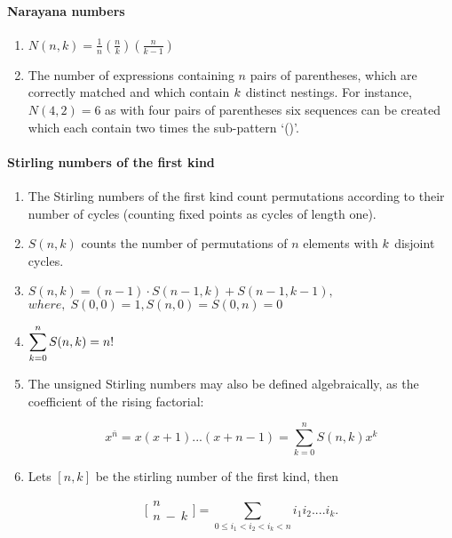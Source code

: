 \paragraph{Narayana numbers}\begin{enumerate}

            
            \item $N(n,k)=\frac{1}{n}\left(\frac{n}{k}\right)\left(\frac{n}{k-1}\right)$
            \item 
                The number of expressions containing $n$ pairs of parentheses, which are correctly matched and which
                    contain
                    $\displaystyle \displaystyle k$ distinct nestings. For instance, $N(4, 2) = 6$ as with four pairs of
                    parentheses six sequences can be created which each contain two times the sub-pattern ‘()’.

                \end{enumerate}
\paragraph{Stirling numbers of the first kind}\begin{enumerate}

            
            \item The Stirling numbers of the first kind count permutations according to their number of cycles (counting
                fixed
                points as cycles of length one).
            \item $S(n,k)$ counts the number of permutations of $n$ elements with $\displaystyle \displaystyle k$ disjoint
                cycles.
            
            \item $S(n,k)=(n-1) \cdot S(n-1,k)+S(n-1,k-1),$
                \(where,\; S(0,0)=1,S(n,0)=S(0,n)=0\)
            \item $\displaystyle \displaystyle\sum_{k=0}^{n}S(n,k) = n!$
            \item 
                The unsigned Stirling numbers may also be defined algebraically, as the coefficient of the rising
                    factorial:
                

                \[\displaystyle x^{\bar{n}} = x(x+1)...(x+n-1) = \sum_{k=0}^{n}{ S(n, k) x^k}\]
            
            \item 
                Lets $[n, k]$ be the stirling number of the first kind, then

                \[\displaystyle \bigl[\!\begin{smallmatrix} n \\ n\ -\ k \end{smallmatrix}\!\bigr] = \sum_{0 \leq i_1
                <
                i_2
                < i_k < n}{i_1i_2....i_k.}\]
                \end{enumerate}

